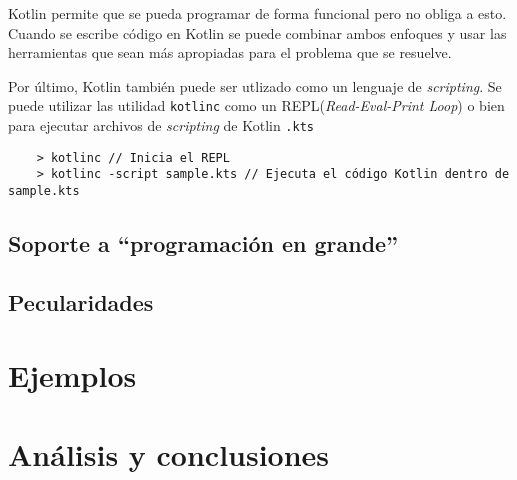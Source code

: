 Kotlin permite que se pueda programar de forma funcional pero no obliga a esto. Cuando se escribe código en Kotlin se puede combinar ambos enfoques y usar las herramientas que sean más apropiadas para el problema que se resuelve.

Por último, Kotlin también puede ser utlizado como un lenguaje de \emph{scripting}. Se puede utilizar las utilidad \texttt{kotlinc} como un REPL(\emph{Read-Eval-Print Loop}) o bien para ejecutar archivos de \emph{scripting} de Kotlin \texttt{.kts}
\begin{verbatim}
    > kotlinc // Inicia el REPL
    > kotlinc -script sample.kts // Ejecuta el código Kotlin dentro de sample.kts
\end{verbatim}



\subsection{Soporte a ``programación en grande''}

\subsection{Pecularidades}

\section{Ejemplos}

\section{Análisis y conclusiones}

